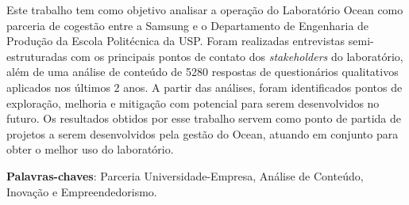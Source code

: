 \setlength{\absparsep}{18pt} %
\begin{resumo}

Este trabalho tem como objetivo analisar a operação do Laboratório Ocean como parceria de cogestão entre a Samsung e o Departamento de Engenharia de Produção da Escola Politécnica da USP. Foram realizadas entrevistas semi-estruturadas com os principais pontos de contato dos \textit{stakeholders} do laboratório, além de uma análise de conteúdo de 5280 respostas de questionários qualitativos aplicados nos últimos 2 anos. A partir das análises, foram identificados pontos de exploração, melhoria e mitigação com potencial para serem desenvolvidos no futuro. Os resultados obtidos por esse trabalho servem como ponto de partida de projetos a serem desenvolvidos pela gestão do Ocean, atuando em conjunto para obter o melhor uso do laboratório.

\textbf{Palavras-chaves}: Parceria Universidade-Empresa, Análise de Conteúdo, Inovação e Empreendedorismo.
\end{resumo}
